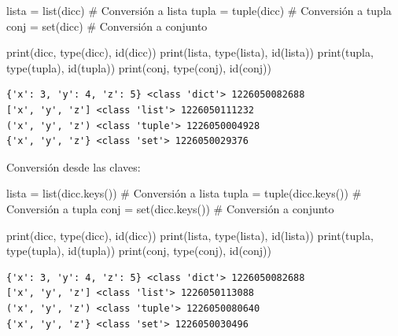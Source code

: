 \documentclass[
  spanish,
  letterpaper,
]{scrbook}
\newenvironment{Shaded}{\begin{snugshade}}{\end{snugshade}}
\newcommand{\BuiltInTok}[1]{\textcolor[rgb]{0.00,0.23,0.31}{#1}}
\newcommand{\CommentTok}[1]{\textcolor[rgb]{0.37,0.37,0.37}{#1}}
\newcommand{\NormalTok}[1]{\textcolor[rgb]{0.00,0.23,0.31}{#1}}
\newcommand{\OperatorTok}[1]{\textcolor[rgb]{0.37,0.37,0.37}{#1}}
\theoremstyle{definition}
\theoremstyle{remark}
\begin{document}
\begin{Shaded}
\begin{Highlighting}[]
\NormalTok{lista }\OperatorTok{=} \BuiltInTok{list}\NormalTok{(dicc)   }\CommentTok{\# Conversión a lista}
\NormalTok{tupla }\OperatorTok{=} \BuiltInTok{tuple}\NormalTok{(dicc)  }\CommentTok{\# Conversión a tupla}
\NormalTok{conj }\OperatorTok{=} \BuiltInTok{set}\NormalTok{(dicc)     }\CommentTok{\# Conversión a conjunto}

\BuiltInTok{print}\NormalTok{(dicc, }\BuiltInTok{type}\NormalTok{(dicc), }\BuiltInTok{id}\NormalTok{(dicc))}
\BuiltInTok{print}\NormalTok{(lista, }\BuiltInTok{type}\NormalTok{(lista), }\BuiltInTok{id}\NormalTok{(lista))}
\BuiltInTok{print}\NormalTok{(tupla, }\BuiltInTok{type}\NormalTok{(tupla), }\BuiltInTok{id}\NormalTok{(tupla))}
\BuiltInTok{print}\NormalTok{(conj, }\BuiltInTok{type}\NormalTok{(conj), }\BuiltInTok{id}\NormalTok{(conj))}
\end{Highlighting}
\end{Shaded}

\begin{verbatim}
{'x': 3, 'y': 4, 'z': 5} <class 'dict'> 1226050082688
['x', 'y', 'z'] <class 'list'> 1226050111232
('x', 'y', 'z') <class 'tuple'> 1226050004928
{'x', 'y', 'z'} <class 'set'> 1226050029376
\end{verbatim}

Conversión desde las claves:

\begin{Shaded}
\begin{Highlighting}[]
\NormalTok{lista }\OperatorTok{=} \BuiltInTok{list}\NormalTok{(dicc.keys())  }\CommentTok{\# Conversión a lista}
\NormalTok{tupla }\OperatorTok{=} \BuiltInTok{tuple}\NormalTok{(dicc.keys()) }\CommentTok{\# Conversión a tupla}
\NormalTok{conj }\OperatorTok{=} \BuiltInTok{set}\NormalTok{(dicc.keys())    }\CommentTok{\# Conversión a conjunto}

\BuiltInTok{print}\NormalTok{(dicc, }\BuiltInTok{type}\NormalTok{(dicc), }\BuiltInTok{id}\NormalTok{(dicc))}
\BuiltInTok{print}\NormalTok{(lista, }\BuiltInTok{type}\NormalTok{(lista), }\BuiltInTok{id}\NormalTok{(lista))}
\BuiltInTok{print}\NormalTok{(tupla, }\BuiltInTok{type}\NormalTok{(tupla), }\BuiltInTok{id}\NormalTok{(tupla))}
\BuiltInTok{print}\NormalTok{(conj, }\BuiltInTok{type}\NormalTok{(conj), }\BuiltInTok{id}\NormalTok{(conj))}
\end{Highlighting}
\end{Shaded}

\begin{verbatim}
{'x': 3, 'y': 4, 'z': 5} <class 'dict'> 1226050082688
['x', 'y', 'z'] <class 'list'> 1226050113088
('x', 'y', 'z') <class 'tuple'> 1226050080640
{'x', 'y', 'z'} <class 'set'> 1226050030496
\end{verbatim}
\end{document}
